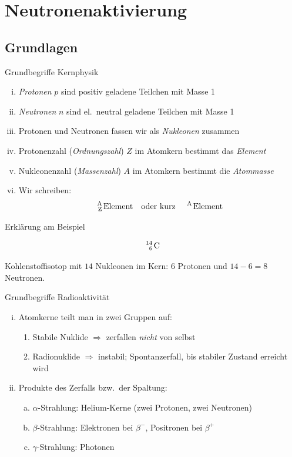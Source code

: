 \documentclass[xcolor=dvipsnames, aspectratio=169]{beamer}
\begin{document}
\section{Neutronenaktivierung}

\subsection{Grundlagen}\printSectionYes
\begin{frame}[<+->]{Grundbegriffe Kernphysik}
\begin{enumerate}[(i)]
\item \emph{Protonen} $p$ sind positiv geladene Teilchen mit Masse 1
\item \emph{Neutronen} $n$ sind el.\ neutral geladene Teilchen mit Masse 1
\item Protonen und Neutronen fassen wir als \emph{Nukleonen} zusammen
\item Protonenzahl (\emph{Ordnungszahl}) $Z$ im Atomkern bestimmt das \emph{Element}
\item Nukleonenzahl (\emph{Massenzahl}) $A$ im Atomkern bestimmt die \emph{Atommasse}
\item Wir schreiben: \[\text{\ce{^A_Z Element}\quad oder kurz \quad\ce{^A Element}}\]
\end{enumerate}
\end{frame}

\begin{frame}{Erklärung am Beispiel}

{\huge\begin{equation*}
\text{\ce{^{14}_{6} C}}
\end{equation*}}\bigskip

Kohlenstoffisotop mit $14$ Nukleonen im Kern: $6$ Protonen und $14-6=8$ Neutronen.
\end{frame}

\begin{frame}[<+->]{Grundbegriffe Radioaktivität}
\begin{enumerate}[(i)]
\item Atomkerne teilt man in zwei Gruppen auf:
\begin{enumerate}[(1)]
\item Stabile Nuklide $\Rightarrow$ zerfallen \emph{nicht} von selbst
\item Radionuklide $\Rightarrow$ instabil; Spontanzerfall, bis stabiler Zustand erreicht wird
\end{enumerate}
\item Produkte des Zerfalls bzw.\ der Spaltung:
\begin{enumerate}[(a)]
\item $\alpha$-Strahlung: Helium-Kerne (zwei Protonen, zwei Neutronen)
\item $\beta$-Strahlung: Elektronen bei $\beta^-$, Positronen bei $\beta^+$
\item $\gamma$-Strahlung: Photonen
\end{enumerate}
\end{enumerate}
\end{frame}
\end{document}
